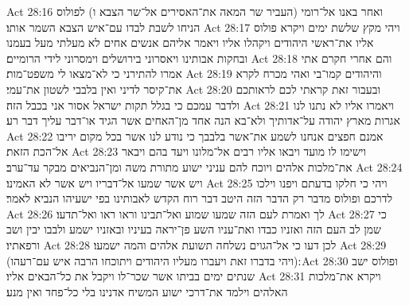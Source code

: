 Act 28:16  ואחר באנו אל־רומי (העביר שר המאה את־האסירים אל־שר הצבא ו) לפולוס הניחו לשבת לבדו עם־איש הצבא השמר אותו׃
Act 28:17  ויהי מקץ שלשת ימים ויקרא פולוס אליו את־ראשי היהודים ויקהלו אליו ויאמר אליהם אנשים אחים לא מעלתי מעל בעמנו ובחקות אבותינו ויאסרוני בירושלים וימסרוני לידי הרומיים׃
Act 28:18  והם אחרי חקרם אתי אמרו להתירני כי לא־מצאו לי משפט־מות׃
Act 28:19  והיהודים קמו־בי ואהי מכרח לקרא את־קיסר לדיני ואין בלבבי לשטון את־עמי׃
Act 28:20  ובעבור זאת קראתי לכם לראותכם ולדבר עמכם כי בגלל תקות ישראל אסור אני בכבל הזה׃
Act 28:21  ויאמרו אליו לא נתנו לנו אגרות מארץ יהודה על־אדותיך ולא־בא הנה אחד מן־האחים אשר הגיד או־דבר עליך דבר רע׃
Act 28:22  אמנם חפצים אנחנו לשמע את־אשר בלבבך כי נודע לנו אשר בכל מקום יריבו אל־הכת הזאת׃
Act 28:23  וישימו לו מועד ויבאו אליו רבים אל־מלונו ויעד בהם ויבאר את־מלכות אלהים ויוכח להם עניני ישוע מתורת משה ומן־הנביאים מבקר עד־ערב׃
Act 28:24  ויש אשר שמעו אל־דבריו ויש אשר לא האמינו׃
Act 28:25  ויהי כי חלקו בדעתם ויפנו וילכו לדרכם ופולוס מדבר רק הדבר הזה היטב דבר רוח הקדש לאבותינו בפי ישעיהו הנביא לאמר׃
Act 28:26  לך ואמרת לעם הזה שמעו שמוע ואל־תבינו וראו ראו ואל־תדעו׃
Act 28:27  כי שמן לב העם הזה ואזניו כבדו ואת־עניו השע פן־יראה בעיניו ובאזניו ישמע ולבבו יבין ושב ורפאתיו׃
Act 28:28  לכן דעו כי אל־הגוים נשלחה תשועת אלהים והמה ישמעו׃
Act 28:29  (ויהי בדברו זאת ויעברו מעליו היהודים ויתוכחו הרבה איש עם־רעהו)׃
Act 28:30  ופולוס ישב שנתים ימים בביתו אשר שכר־לו ויקבל את כל־הבאים אליו׃
Act 28:31  ויקרא את־מלכות האלהים וילמד את־דרכי ישוע המשיח אדנינו בלי כל־פחד ואין מנע׃


